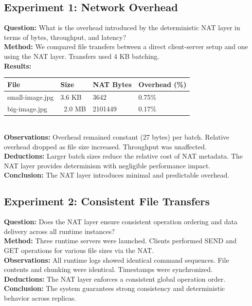 \documentclass[10pt, 
]{IEEEtran}
\begin{document}
\subsection{Experiment 1: Network Overhead}
\textbf{Question:} What is the overhead introduced by the deterministic NAT layer in terms of bytes, throughput, and latency? \\ 
\textbf{Method:} We compared file transfers between a direct client-server setup and one using the NAT layer. Transfers used 4 KB batching. \\ 
\textbf{Results:}
\newline

\begin{tabular}{|l|l|l|l|}
\hline
\textbf{File} & \textbf{Size} & \textbf{NAT Bytes} & \textbf{Overhead (\%)} \\ \hline
small-image.jpg & 3.6 KB & 3642 & 0.75\% \\ \hline
big-image.jpg & ~2.0 MB & 2101449 & 0.17\% \\ \hline
\end{tabular} \\ 
\newline
\textbf{Observations:} Overhead remained constant (27 bytes) per batch. Relative overhead dropped as file size increased. Throughput was unaffected. \\ 
\textbf{Deductions:} Larger batch sizes reduce the relative cost of NAT metadata. The NAT layer provides determinism with negligible performance impact. \\ 
\textbf{Conclusion:} The NAT layer introduces minimal and predictable overhead.

\subsection{Experiment 2: Consistent File Transfers}
\textbf{Question:} Does the NAT layer ensure consistent operation ordering and data delivery across all runtime instances? \\ 
\textbf{Method:} Three runtime servers were launched. Clients performed SEND and GET operations for various file sizes via the NAT. \\ 
\textbf{Observations:} All runtime logs showed identical command sequences. File contents and chunking were identical. Timestamps were synchronized. \\ 
\textbf{Deductions:} The NAT layer enforces a consistent global operation order. \\ 
\textbf{Conclusion:} The system guarantees strong consistency and deterministic behavior across replicas.
\end{document}

